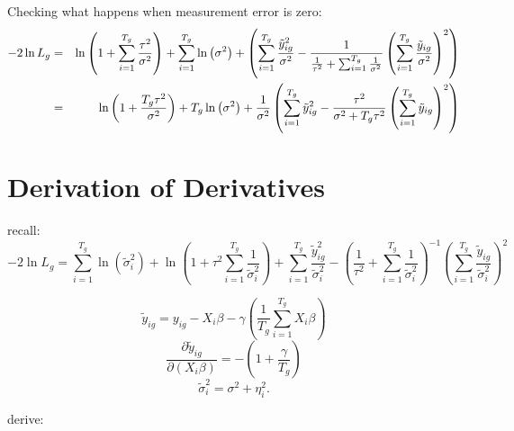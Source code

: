 \documentclass[12pt]{article}
\begin{document}
Checking what happens when measurement error is zero:%
\begin{eqnarray*}
-2\ln L_{g} &=&\ln \left( 1+\sum_{i=1}^{T_{g}}\frac{\tau ^{2}}{\sigma ^{2}}%
\right) +\sum_{i=1}^{T_{g}}\ln \left( \sigma ^{2}\right) +\left(
\sum_{i=1}^{T_{g}}\frac{\tilde{y}_{ig}^{2}}{\sigma ^{2}}-\frac{1}{\frac{1}{%
\tau ^{2}}+\sum_{i=1}^{T_{g}}\frac{1}{\sigma ^{2}}}\left( \sum_{i=1}^{T_{g}}%
\frac{\tilde{y}_{ig}}{\sigma ^{2}}\right) ^{2}\right) \\
&=&\ln \left( 1+\frac{T_{g}\tau ^{2}}{\sigma ^{2}}\right) +T_{g}\ln \left(
\sigma ^{2}\right) +\frac{1}{\sigma ^{2}}\left( \sum_{i=1}^{T_{g}}\tilde{y}%
_{ig}^{2}-\frac{\tau ^{2}}{\sigma ^{2}+T_{g}\tau ^{2}}\left(
\sum_{i=1}^{T_{g}}\tilde{y}_{ig}\right) ^{2}\right)
\end{eqnarray*}

\section{Derivation of Derivatives}

recall:%
\[
-2\ln L_{g}=\sum_{i=1}^{T_{g}}\ln \left( \tilde{\sigma}_{i}^{2}\right) +\ln
\left( 1+\tau ^{2}\sum_{i=1}^{T_{g}}\frac{1}{\tilde{\sigma}_{i}^{2}}\right)
+\sum_{i=1}^{T_{g}}\frac{\tilde{y}_{ig}^{2}}{\tilde{\sigma}_{i}^{2}}-\left( 
\frac{1}{\tau ^{2}}+\sum_{i=1}^{T_{g}}\frac{1}{\tilde{\sigma}_{i}^{2}}%
\right) ^{-1}\left( \sum_{i=1}^{T_{g}}\frac{\tilde{y}_{ig}}{\tilde{\sigma}%
_{i}^{2}}\right) ^{2} 
\]

\[
\tilde{y}_{ig}=y_{ig}-X_{i}\beta -\gamma \left( \frac{1}{T_{g}}%
\sum_{i=1}^{T_{g}}X_{i}\beta \right) 
\]%
\[
\frac{\partial \tilde{y}_{ig}}{\partial \left( X_{i}\beta \right) }=-\left(
1+\frac{\gamma }{T_{g}}\right) 
\]%
\[
\tilde{\sigma}_{i}^{2}=\sigma ^{2}+\eta _{i}^{2}. 
\]

derive:
\end{document}
